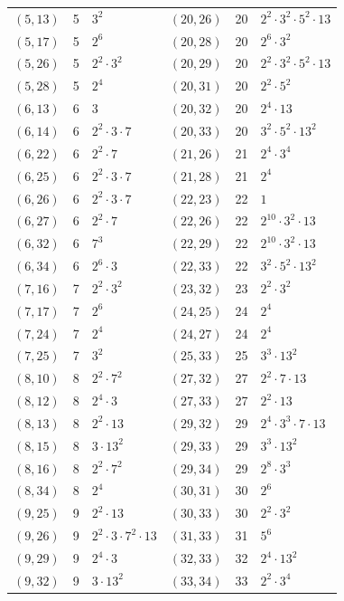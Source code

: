 \documentclass[11pt]{article}
\begin{document}
\begin{longtable}{@{}lrl@{\qquad}lrl@{}}
$(5,13)$ & 5 & $3^{2}$ & $(20,26)$ & 20 & $2^{2}\cdot 3^{2}\cdot 5^{2}\cdot 13$\\
$(5,17)$ & 5 & $2^{6}$ & $(20,28)$ & 20 & $2^{6}\cdot 3^{2}$\\
$(5,26)$ & 5 & $2^{2}\cdot 3^{2}$ & $(20,29)$ & 20 & $2^{2}\cdot 3^{2}\cdot 5^{2}\cdot 13$\\
$(5,28)$ & 5 & $2^{4}$ & $(20,31)$ & 20 & $2^{2}\cdot 5^{2}$\\
$(6,13)$ & 6 & $3$ & $(20,32)$ & 20 & $2^{4}\cdot 13$\\
$(6,14)$ & 6 & $2^{2}\cdot 3\cdot 7$ & $(20,33)$ & 20 & $3^{2}\cdot 5^{2}\cdot 13^{2}$\\
$(6,22)$ & 6 & $2^{2}\cdot 7$ & $(21,26)$ & 21 & $2^{4}\cdot 3^{4}$\\
$(6,25)$ & 6 & $2^{2}\cdot 3\cdot 7$ & $(21,28)$ & 21 & $2^{4}$\\
$(6,26)$ & 6 & $2^{2}\cdot 3\cdot 7$ & $(22,23)$ & 22 & $1$\\
$(6,27)$ & 6 & $2^{2}\cdot 7$ & $(22,26)$ & 22 & $2^{10}\cdot 3^{2}\cdot 13$\\
$(6,32)$ & 6 & $7^{3}$ & $(22,29)$ & 22 & $2^{10}\cdot 3^{2}\cdot 13$\\
$(6,34)$ & 6 & $2^{6}\cdot 3$ & $(22,33)$ & 22 & $3^{2}\cdot 5^{2}\cdot 13^{2}$\\
$(7,16)$ & 7 & $2^{2}\cdot 3^{2}$ & $(23,32)$ & 23 & $2^{2}\cdot 3^{2}$\\
$(7,17)$ & 7 & $2^{6}$ & $(24,25)$ & 24 & $2^{4}$\\
$(7,24)$ & 7 & $2^{4}$ & $(24,27)$ & 24 & $2^{4}$\\
$(7,25)$ & 7 & $3^{2}$ & $(25,33)$ & 25 & $3^{3}\cdot 13^{2}$\\
$(8,10)$ & 8 & $2^{2}\cdot 7^{2}$ & $(27,32)$ & 27 & $2^{2}\cdot 7\cdot 13$\\
$(8,12)$ & 8 & $2^{4}\cdot 3$ & $(27,33)$ & 27 & $2^{2}\cdot 13$\\
$(8,13)$ & 8 & $2^{2}\cdot 13$ & $(29,32)$ & 29 & $2^{4}\cdot 3^{3}\cdot 7\cdot 13$\\
$(8,15)$ & 8 & $3\cdot 13^{2}$ & $(29,33)$ & 29 & $3^{3}\cdot 13^{2}$\\
$(8,16)$ & 8 & $2^{2}\cdot 7^{2}$ & $(29,34)$ & 29 & $2^{8}\cdot 3^{3}$\\
$(8,34)$ & 8 & $2^{4}$ & $(30,31)$ & 30 & $2^{6}$\\
$(9,25)$ & 9 & $2^{2}\cdot 13$ & $(30,33)$ & 30 & $2^{2}\cdot 3^{2}$\\
$(9,26)$ & 9 & $2^{2}\cdot 3\cdot 7^{2}\cdot 13$ & $(31,33)$ & 31 & $5^{6}$\\
$(9,29)$ & 9 & $2^{4}\cdot 3$ & $(32,33)$ & 32 & $2^{4}\cdot 13^{2}$\\
$(9,32)$ & 9 & $3\cdot 13^{2}$ & $(33,34)$ & 33 & $2^{2}\cdot 3^{4}$\\
\end{longtable}
\endgroup
\end{document}
